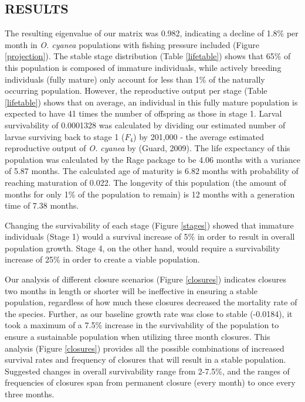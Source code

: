 \documentclass[
]{article}
\begin{document}
\hypertarget{results}{%
\subsection{RESULTS}\label{results}}

The resulting eigenvalue of our matrix was 0.982, indicating a decline of 1.8\% per month in \emph{O. cyanea} populations with fishing pressure included (Figure \ref{projection}). The stable stage distribution (Table \ref{lifetable}) shows that 65\% of this population is composed of immature individuals, while actively breeding individuals (fully mature) only account for less than 1\% of the naturally occurring population. However, the reproductive output per stage (Table \ref{lifetable}) shows that on average, an individual in this fully mature population is expected to have 41 times the number of offspring as those in stage 1. Larval survivability of 0.0001328 was calculated by dividing our estimated number of larvae surviving back to stage 1 (\(F_4\)) by 201,000 - the average estimated reproductive output of \emph{O. cyanea} by (Guard, 2009). The life expectancy of this population was calculated by the Rage package to be 4.06 months with a variance of 5.87 months. The calculated age of maturity is 6.82 months with probability of reaching maturation of 0.022. The longevity of this population (the amount of months for only 1\% of the population to remain) is 12 months with a generation time of 7.38 months.

Changing the survivability of each stage (Figure \ref{stages}) showed that immature individuals (Stage 1) would a survival increase of 5\% in order to result in overall population growth. Stage 4, on the other hand, would require a survivability increase of 25\% in order to create a viable population.

Our analysis of different closure scenarios (Figure \ref{closures}) indicates closures two months in length or shorter will be ineffective in ensuring a stable population, regardless of how much these closures decreased the mortality rate of the species. Further, as our baseline growth rate was close to stable (-0.0184), it took a maximum of a 7.5\% increase in the survivability of the population to ensure a sustainable population when utilizing three month closures. This analysis (Figure \ref{closures}) provides all the possible combinations of increased survival rates and frequency of closures that will result in a stable population. Suggested changes in overall survivability range from 2-7.5\%, and the ranges of frequencies of closures span from permanent closure (every month) to once every three months.
\end{document}
